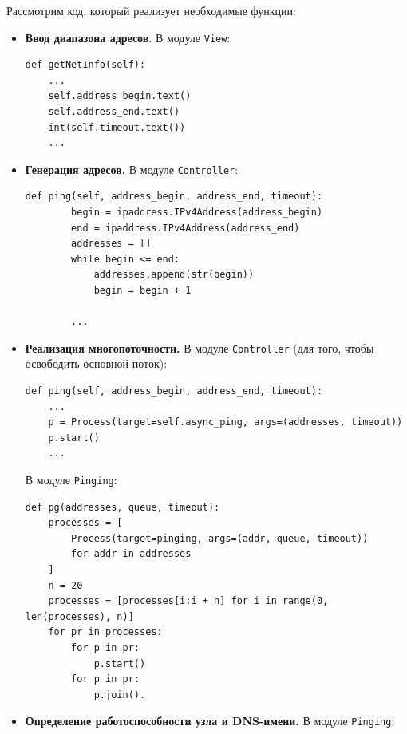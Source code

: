 \documentclass[a4paper]{article}
\begin{document}
		Рассмотрим код, который реализует необходимые функции:
		
		\begin{itemize}
			\item \textbf{Ввод диапазона адресов}. В модуле \texttt{View}:
			
			\begin{verbatim}
def getNetInfo(self):
    ...
    self.address_begin.text()
    self.address_end.text()
    int(self.timeout.text())
    ...
			\end{verbatim}
			
			\item \textbf{Генерация адресов.} В модуле \texttt{Controller}:
			\begin{verbatim}
def ping(self, address_begin, address_end, timeout):
        begin = ipaddress.IPv4Address(address_begin)
        end = ipaddress.IPv4Address(address_end)
        addresses = []
        while begin <= end:
            addresses.append(str(begin))
            begin = begin + 1
            
        ...
			\end{verbatim}
		
			\item \textbf{Реализация многопоточности.} В модуле \texttt{Controller} (для того, чтобы освободить основной поток):
			
			\begin{verbatim}
def ping(self, address_begin, address_end, timeout):
    ...
    p = Process(target=self.async_ping, args=(addresses, timeout))
    p.start()
    ...
			\end{verbatim}
			
			В модуле \texttt{Pinging}:
			
			\begin{verbatim}
def pg(addresses, queue, timeout):
    processes = [
        Process(target=pinging, args=(addr, queue, timeout))
        for addr in addresses
    ]
    n = 20
    processes = [processes[i:i + n] for i in range(0, len(processes), n)]
    for pr in processes:
        for p in pr:
            p.start()
        for p in pr:
            p.join().
			\end{verbatim}	
			
			\item \textbf{Определение работоспособности узла и DNS-имени.} В модуле \texttt{Pinging}:
			

\end{itemize}
\end{document}
